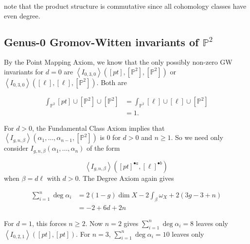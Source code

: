 \documentclass{amsart}
\newcommand{\PP}{\mathbb{P}}\newcommand{\A}{\mathbb{A}}\newcommand{\Z}{\mathbb{Z}}\newcommand{\C}{\mathbb{C}}\newcommand{\N}{\mathbb{N}}\newcommand{\T}{\mathbb{T}}
\begin{document}
note that the product structure is commutative since all cohomology classes have even degree. 










\subsection{Genus-0 Gromov-Witten invariants of $\PP^2$}

\label{sec: GWinvtsP2}

By the Point Mapping Axiom, we know that the only possibly non-zero GW invariants for $d=0$ are $\left<I_{0,3,0}\right>([pt],[\PP^2],[\PP^2])$ or $\left<I_{0,3,0}\right>([\ell],[\ell],[\PP^2])$. Both are

\begin{align*}
    \int_{\PP^2}[pt]\cup[\PP^2]\cup[\PP^2] &= \int_{\PP^2}[\ell]\cup[\ell]\cup[\PP^2] \\
    &= 1.
\end{align*}

For $d>0$, the Fundamental Class Axiom implies that $\left<I_{g,n,\beta}\right>(\alpha_1,\dots, \alpha_{n-1},[\PP^2])$ is $0$ for $d>0$ and $n\geq 1$. So we need only consider $I_{g,n,\beta}(\alpha_1, \dots, \alpha_n)$ of the form

\[ \left< I_{g,n,\beta}\right>([pt]^{\bullet a}, [\ell]^{\bullet b}) \] when $\beta=d\ell$ with $d>0$. The Degree Axiom again gives

\begin{align*}
\sum_{i=1}^n \deg \alpha_i &= 2(1-g)\dim X - 2\int_\beta \omega_X + 2(3g-3+n)\\
&= -2 + 6d+2n
\end{align*} 

For $d=1$, this forces $n\geq 2$. Now $n=2$ gives $\sum_{i=1}^n \deg \alpha_i = 8$ leaves only $\left<I_{0,2,1}\right>([pt],[pt])$. For $n=3$, $\sum_{i=1}^n \deg\alpha_i=10$ leaves only
\end{document}

